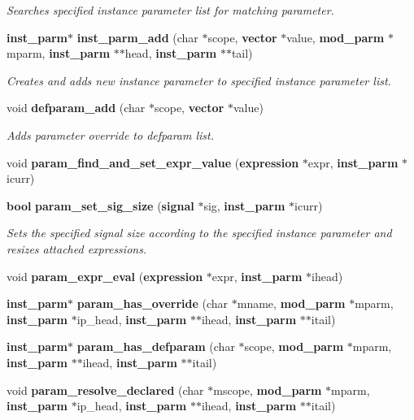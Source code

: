 \begin{CompactItemize}
\begin{CompactList}\small\item\em Searches specified instance parameter list for matching parameter.\item\end{CompactList}\item 
{\bf inst\_\-parm}$\ast$ {\bf inst\_\-parm\_\-add} (char $\ast$scope, {\bf vector} $\ast$value, {\bf mod\_\-parm} $\ast$mparm, {\bf inst\_\-parm} $\ast$$\ast$head, {\bf inst\_\-parm} $\ast$$\ast$tail)
\begin{CompactList}\small\item\em Creates and adds new instance parameter to specified instance parameter list.\item\end{CompactList}\item 
void {\bf defparam\_\-add} (char $\ast$scope, {\bf vector} $\ast$value)
\begin{CompactList}\small\item\em Adds parameter override to defparam list.\item\end{CompactList}\item 
void {\bf param\_\-find\_\-and\_\-set\_\-expr\_\-value} ({\bf expression} $\ast$expr, {\bf inst\_\-parm} $\ast$icurr)
\item 
{\bf bool} {\bf param\_\-set\_\-sig\_\-size} ({\bf signal} $\ast$sig, {\bf inst\_\-parm} $\ast$icurr)
\begin{CompactList}\small\item\em Sets the specified signal size according to the specified instance parameter and resizes attached expressions.\item\end{CompactList}\item 
void {\bf param\_\-expr\_\-eval} ({\bf expression} $\ast$expr, {\bf inst\_\-parm} $\ast$ihead)
\item 
{\bf inst\_\-parm}$\ast$ {\bf param\_\-has\_\-override} (char $\ast$mname, {\bf mod\_\-parm} $\ast$mparm, {\bf inst\_\-parm} $\ast$ip\_\-head, {\bf inst\_\-parm} $\ast$$\ast$ihead, {\bf inst\_\-parm} $\ast$$\ast$itail)
\item 
{\bf inst\_\-parm}$\ast$ {\bf param\_\-has\_\-defparam} (char $\ast$scope, {\bf mod\_\-parm} $\ast$mparm, {\bf inst\_\-parm} $\ast$$\ast$ihead, {\bf inst\_\-parm} $\ast$$\ast$itail)
\item 
void {\bf param\_\-resolve\_\-declared} (char $\ast$mscope, {\bf mod\_\-parm} $\ast$mparm, {\bf inst\_\-parm} $\ast$ip\_\-head, {\bf inst\_\-parm} $\ast$$\ast$ihead, {\bf inst\_\-parm} $\ast$$\ast$itail)

\end{CompactItemize}
